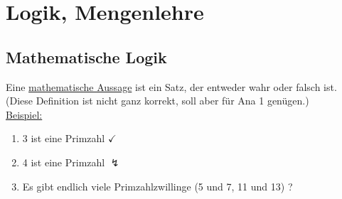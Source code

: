 \chapter{Logik, Mengenlehre}
\section{Mathematische Logik}
Eine \underline{mathematische Aussage} ist ein Satz, der entweder wahr oder falsch ist. (Diese Definition ist nicht ganz korrekt, soll aber für Ana 1 genügen.)\\
\underline{Beispiel:} 
\begin{enumerate}[label=\roman*]
\item 3 ist eine Primzahl \qquad\qquad $\checkmark$
\item 4 ist eine Primzahl \qquad\qquad$\lightning$
\item Es gibt endlich viele Primzahlzwillinge (5 und 7, 11 und 13) ?
\end{enumerate}
